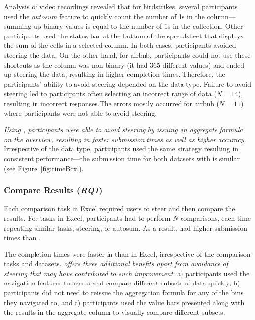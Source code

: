  Analysis of video recordings
revealed that for birdstrikes, several participants 
used the \emph{autosum}
feature to quickly count the number of 1s in the column---summing up 
binary values is equal to the number of $1$s in the collection. 
Other participants used the status bar at the 
bottom of the spreadsheet that displays the sum 
of the cells in a selected column. 
In both cases, participants avoided steering the data. 
On the other hand, for airbnb, participants 
could not use these shortcuts as the column was non-binary 
(it had 365 different values) 
and ended up steering the data, resulting in higher completion times. 
Therefore, the participants’ ability to avoid steering 
depended on the data type. 
Failure to avoid steering led to participants 
often selecting an incorrect range of data ($N=14$), resulting in incorrect
responses.The errors mostly occurred for airbnb ($N=11$) where participants
were not able to avoid steering. 

 \emph{Using \noah, participants were able to avoid steering by issuing an aggregate formula 
on the overview, resulting in faster submission 
times as well as higher accuracy.} 
Irrespective of the data type, participants used the same strategy  
resulting in consistent performance---the submission time 
for both datasets with \noah is similar (see Figure~\ref{fig:timeBox}). 
\subsubsection{Compare Results (\emph{RQ1})}
Each comparison task in Excel required users to steer 
and then compare the results. 
For \cmpB tasks in Excel, participants 
had to perform $N$ comparisons, 
each time repeating similar tasks, \eg steering, or autosum.
As a result, \cmpB had higher submission times than \cmpA. 

 The completion times were faster in \noah
than in Excel, irrespective of the comparison tasks and datasets. \emph{\noah offers three additional
benefits apart from avoidance of steering that may have contributed to such improvement}:
a) participants used the navigation features to access
and compare different subsets of data quickly, 
b) participants did not need to reissue the
aggregation formula for any of the bins they navigated to, and 
c) participants used the value bars presented along with
the results in the aggregate column to visually compare different subsets.

